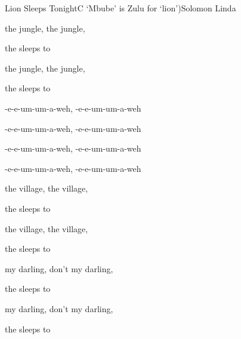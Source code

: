 \begin{SBSong}{Lion  Sleeps Tonight}{C}
{`Mbube' is Zulu for `lion')}{Solomon Linda}
\begin{SBVerse}
   the jungle, the  jungle,

  the  sleeps to 

   the jungle, the  jungle,

  the  sleeps to 
\end{SBVerse}
\begin{SBChorus}
  -e-e-um-um-a-weh, -e-e-um-um-a-weh

  -e-e-um-um-a-weh, -e-e-um-um-a-weh

  -e-e-um-um-a-weh, -e-e-um-um-a-weh

  -e-e-um-um-a-weh, -e-e-um-um-a-weh
\end{SBChorus}
\begin{SBVerse}
   the village, the  village,

  the  sleeps to 

   the village, the  village,

  the  sleeps to 
\end{SBVerse}
\begin{SBVerse}

   my darling, don't  my darling,

  the  sleeps to 

   my darling, don't  my darling,

  the  sleeps to 
\end{SBVerse}
\end{SBSong}
